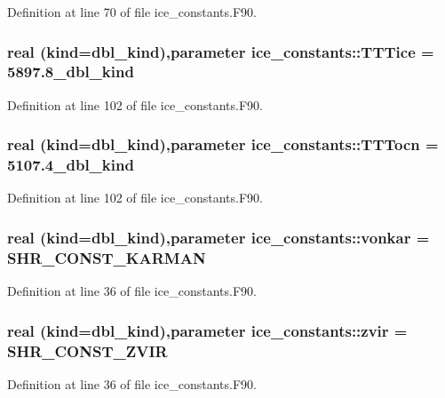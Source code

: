Definition at line 70 of file ice\_\-constants.F90.\hypertarget{namespaceice__constants_abca4267cd2edc853a5213d463487c28f}{
\subsubsection[{TTTice}]{\setlength{\rightskip}{0pt plus 5cm}real (kind=dbl\_\-kind),parameter {\bf ice\_\-constants::TTTice} = 5897.8\_\-dbl\_\-kind}}
\label{namespaceice__constants_abca4267cd2edc853a5213d463487c28f}


Definition at line 102 of file ice\_\-constants.F90.\hypertarget{namespaceice__constants_a79068c1f0079cf6a81045ae75ef7d30f}{
\subsubsection[{TTTocn}]{\setlength{\rightskip}{0pt plus 5cm}real (kind=dbl\_\-kind),parameter {\bf ice\_\-constants::TTTocn} = 5107.4\_\-dbl\_\-kind}}
\label{namespaceice__constants_a79068c1f0079cf6a81045ae75ef7d30f}


Definition at line 102 of file ice\_\-constants.F90.\hypertarget{namespaceice__constants_a16411cd5c8476ea99195954dd945cc44}{
\subsubsection[{vonkar}]{\setlength{\rightskip}{0pt plus 5cm}real (kind=dbl\_\-kind),parameter {\bf ice\_\-constants::vonkar} = SHR\_\-CONST\_\-KARMAN}}
\label{namespaceice__constants_a16411cd5c8476ea99195954dd945cc44}


Definition at line 36 of file ice\_\-constants.F90.\hypertarget{namespaceice__constants_a87b8d7a8a072b85b26c14b96e443879e}{
\subsubsection[{zvir}]{\setlength{\rightskip}{0pt plus 5cm}real (kind=dbl\_\-kind),parameter {\bf ice\_\-constants::zvir} = SHR\_\-CONST\_\-ZVIR}}
\label{namespaceice__constants_a87b8d7a8a072b85b26c14b96e443879e}


Definition at line 36 of file ice\_\-constants.F90.